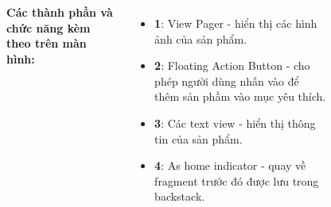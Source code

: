 \documentclass{beamer}
\begin{document}
\begin{frame}
\begin{columns}
\begin{figure}
        \end{figure}
        \indent \textbf{Các thành phần và chức năng kèm theo trên màn hình:}
        \begin{itemize}
            \item \textbf{1}: View Pager - hiển thị các hình ảnh của sản phẩm.
            \item \textbf{2}: Floating Action Button - cho phép người dùng nhấn vào để thêm sản phầm vào mục yêu thích.
            \item \textbf{3}: Các text view - hiển thị thông tin của sản phẩm.
            \item \textbf{4}: As home indicator - quay về fragment trước đó được lưu trong backstack.
        \end{itemize}
    \end{columns}
\end{frame}
\end{document}
